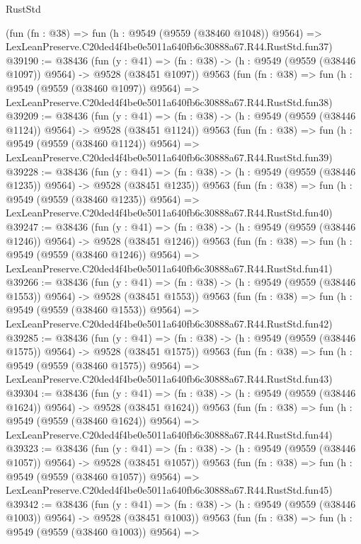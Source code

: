 \begin{lexlean}{RustStd}
\begin{coremodule}
    (fun (fn : @38) =>
    fun (h : @9549 (@9559 (@38460 @1048)) @9564) =>
    LexLeanPreserve.C20ded4f4be0e5011a640fb6c30888a67.R44.RustStd.fun37)
@39190 := @38436
    (fun (y : @41) =>
    (fn : @38) -> (h : @9549 (@9559 (@38446 @1097)) @9564) -> @9528 (@38451 @1097))
    @9563
    (fun (fn : @38) =>
    fun (h : @9549 (@9559 (@38460 @1097)) @9564) =>
    LexLeanPreserve.C20ded4f4be0e5011a640fb6c30888a67.R44.RustStd.fun38)
@39209 := @38436
    (fun (y : @41) =>
    (fn : @38) -> (h : @9549 (@9559 (@38446 @1124)) @9564) -> @9528 (@38451 @1124))
    @9563
    (fun (fn : @38) =>
    fun (h : @9549 (@9559 (@38460 @1124)) @9564) =>
    LexLeanPreserve.C20ded4f4be0e5011a640fb6c30888a67.R44.RustStd.fun39)
@39228 := @38436
    (fun (y : @41) =>
    (fn : @38) -> (h : @9549 (@9559 (@38446 @1235)) @9564) -> @9528 (@38451 @1235))
    @9563
    (fun (fn : @38) =>
    fun (h : @9549 (@9559 (@38460 @1235)) @9564) =>
    LexLeanPreserve.C20ded4f4be0e5011a640fb6c30888a67.R44.RustStd.fun40)
@39247 := @38436
    (fun (y : @41) =>
    (fn : @38) -> (h : @9549 (@9559 (@38446 @1246)) @9564) -> @9528 (@38451 @1246))
    @9563
    (fun (fn : @38) =>
    fun (h : @9549 (@9559 (@38460 @1246)) @9564) =>
    LexLeanPreserve.C20ded4f4be0e5011a640fb6c30888a67.R44.RustStd.fun41)
@39266 := @38436
    (fun (y : @41) =>
    (fn : @38) -> (h : @9549 (@9559 (@38446 @1553)) @9564) -> @9528 (@38451 @1553))
    @9563
    (fun (fn : @38) =>
    fun (h : @9549 (@9559 (@38460 @1553)) @9564) =>
    LexLeanPreserve.C20ded4f4be0e5011a640fb6c30888a67.R44.RustStd.fun42)
@39285 := @38436
    (fun (y : @41) =>
    (fn : @38) -> (h : @9549 (@9559 (@38446 @1575)) @9564) -> @9528 (@38451 @1575))
    @9563
    (fun (fn : @38) =>
    fun (h : @9549 (@9559 (@38460 @1575)) @9564) =>
    LexLeanPreserve.C20ded4f4be0e5011a640fb6c30888a67.R44.RustStd.fun43)
@39304 := @38436
    (fun (y : @41) =>
    (fn : @38) -> (h : @9549 (@9559 (@38446 @1624)) @9564) -> @9528 (@38451 @1624))
    @9563
    (fun (fn : @38) =>
    fun (h : @9549 (@9559 (@38460 @1624)) @9564) =>
    LexLeanPreserve.C20ded4f4be0e5011a640fb6c30888a67.R44.RustStd.fun44)
@39323 := @38436
    (fun (y : @41) =>
    (fn : @38) -> (h : @9549 (@9559 (@38446 @1057)) @9564) -> @9528 (@38451 @1057))
    @9563
    (fun (fn : @38) =>
    fun (h : @9549 (@9559 (@38460 @1057)) @9564) =>
    LexLeanPreserve.C20ded4f4be0e5011a640fb6c30888a67.R44.RustStd.fun45)
@39342 := @38436
    (fun (y : @41) =>
    (fn : @38) -> (h : @9549 (@9559 (@38446 @1003)) @9564) -> @9528 (@38451 @1003))
    @9563
    (fun (fn : @38) =>
    fun (h : @9549 (@9559 (@38460 @1003)) @9564) =>

\end{coremodule}
\end{lexlean}

